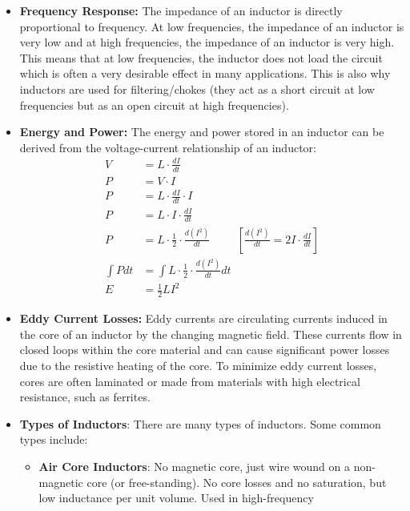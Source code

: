 \begin{itemize}
    do this as it simplifies the analysis a lot. The admittance
    version of Ohm's law is:
    \[
      I = V \cdot Y
    \]
  \item \textbf{Frequency Response:}
    The impedance of an inductor is directly proportional to
    frequency. At low frequencies, the impedance of an inductor is
    very low and at high frequencies, the impedance of an inductor
    is very high. This means that at low frequencies, the inductor
    does not load the circuit which is often a very desirable
    effect  in many applications. This is also why inductors are
    used for filtering/chokes (they act as a short circuit at low
    frequencies but as an open circuit at high frequencies).
  \item \textbf{Energy and Power:}
    The energy and power stored in an inductor can be derived
    from the voltage-current relationship of an inductor:
    \begin{align*}
      V &= L \cdot \frac{dI}{dt} \\
      P &= V \cdot I \\
      P &= L \cdot \frac{dI}{dt} \cdot I \\
      P &= L \cdot I \cdot \frac{dI}{dt} \\
      P &= L \cdot \frac{1}{2} \cdot \frac{d(I^2)}{dt} \hspace{1cm} [\frac{d(I^2)}{dt} = 2I \cdot \frac{dI}{dt}] \\
      \int P dt &= \int L \cdot \frac{1}{2} \cdot \frac{d(I^2)}{dt} dt \\
      E &= \frac{1}{2} L I^2
    \end{align*}
  \item \textbf{Eddy Current Losses:}
    Eddy currents are circulating currents induced in the core of an
    inductor by the changing magnetic field. These currents flow in
    closed loops within the core material and can cause significant
    power losses due to the resistive heating of the core. To minimize
    eddy current losses, cores are often laminated or made from
    materials with high electrical resistance, such as ferrites.
  \item \textbf{Types of Inductors}:
    There are many types of inductors. Some common types include:
    \begin{itemize}
      \item \textbf{Air Core Inductors}: No magnetic core, just wire wound
        on a non-magnetic core (or free-standing). No core losses and no
        saturation, but low inductance per unit volume. Used in high-frequency

\end{itemize}
\end{itemize}
